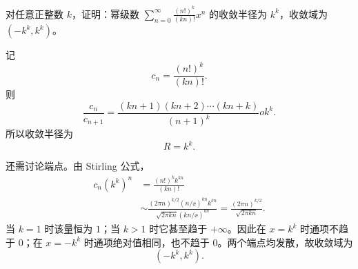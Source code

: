 \begin{xexercise}[4]
对任意正整数 $k$，证明：幂级数 $\displaystyle\sum_{n=0}^{\infty}\frac{(n!)^k}{(kn)!}x^n$ 的收敛半径为 $k^k$，收敛域为 $(-k^k,k^k)$。
\end{xexercise}
\begin{xsolution}
记
\[
  c_n=\frac{(n!)^k}{(kn)!}.
\]
则
\[
  \frac{c_n}{c_{n+1}}
  =\frac{(kn+1)(kn+2)\cdots(kn+k)}{(n+1)^k}	o k^k.
\]
所以收敛半径为
\[
  R=k^k.
\]

还需讨论端点。由 Stirling 公式，
\[
\begin{aligned}
  c_n(k^k)^n
  &=\frac{(n!)^k k^{kn}}{(kn)!}\\
  &\sim\frac{(2\pi n)^{k/2}(n/\ee)^{kn}k^{kn}}
  {\sqrt{2\pi kn}(kn/\ee)^{kn}}
  =\frac{(2\pi n)^{k/2}}{\sqrt{2\pi kn}}.
\end{aligned}
\]
当 $k=1$ 时该量恒为 $1$；当 $k>1$ 时它甚至趋于 $+\infty$。因此在 $x=k^k$ 时通项不趋于 $0$；在 $x=-k^k$ 时通项绝对值相同，也不趋于 $0$。两个端点均发散，故收敛域为
\[
  \boxed{(-k^k,k^k)}.
\]
\end{xsolution}


